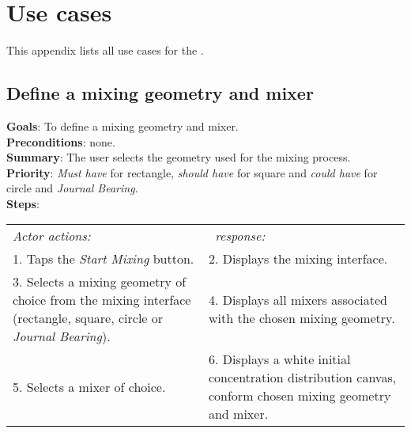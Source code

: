 \chapter{Use cases}
This appendix lists all use cases for the \applicationname.

\section{Define a mixing geometry and mixer}
  \label{geomixer}
  \textbf{Goals}: To define a mixing geometry and mixer.\\
  \textbf{Preconditions}: none.\\
  \textbf{Summary}: The user selects the geometry used for the mixing process.\\
  \textbf{Priority}: \emph{Must have} for rectangle, \emph{should have} for square and \emph{could have} for circle and \emph{Journal Bearing}.\\
  \textbf{Steps}: \\
  \begin{tabular}{ p{} p{} }
  	\emph{Actor actions:} & \emph{\projectname\ response:} \\
	1. Taps the \emph{Start Mixing} button. & 2. Displays the mixing interface.\\
	3. Selects a mixing geometry of choice from the mixing interface (rectangle, square, circle or \emph{Journal Bearing}). & 4. Displays all mixers associated with the chosen mixing geometry. \\
	5. Selects a mixer of choice. & 6. Displays a white initial concentration distribution canvas, conform chosen mixing geometry and mixer.\\
  \end{tabular}

